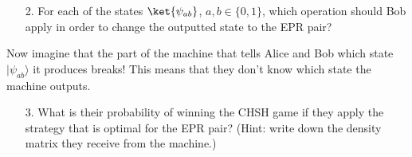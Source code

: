 \begin{exercises}
\begin{enumerate}
\item[2.] For each of the states $\ket{\psi_{ab}}$, $a,b\in\{0,1\}$, which operation should Bob apply in order to change the outputted state to the EPR pair?
%
%
\end{enumerate}
Now imagine that the part of the machine that tells Alice and Bob which state \(|\psi_{ab}\rangle\) it produces breaks! This means that they don't know which state the machine outputs.
\begin{enumerate}
\item[3.] What is  their probability of winning the CHSH game if they apply the strategy that is optimal for the EPR pair? (Hint: write down the density matrix they receive from the machine.)
\end{enumerate}



\end{exercises}
